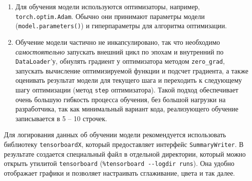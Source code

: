 \begin{enumerate}
\begin{remark}
    \end{remark}
    \item Для обучения модели используются оптимизаторы, например, \texttt{torch.optim.Adam}. Обычно они принимают параметры модели (\texttt{model.parameters()}) и гиперпараметры для алгоритма оптимизации.
    \item Обучение модели частично не инкапсулировано, так что необходимо \textit{самостоятельно} запускать внешний цикл по эпохам и внутренний по \texttt{DataLoader}'у, обнулять градиент у оптимизатора методом \texttt{zero\_grad}, запускать вычисление оптимизируемой функции и подсчет градиента, а также оценивать результат модели для текущего шага и переходить к следующему шагу оптимизации (метод \texttt{step} оптимизатора). Такой подход обеспечивает очень большую гибкость процесса обучения, без большой нагрузки на разработчика, так как минимальный вариант кода, реализующего обучение записывается в 5 -- 10 строчек. 
\end{enumerate}

\begin{remark}
    Для логирования данных об обучении модели рекомендуется использовать библиотеку \texttt{tensorboardX}, который предоставляет интерфейс \texttt{SummaryWriter}. В результате создается специальный файл в отдельной директории, который можно открыть утилитой \texttt{tensorboard} (\texttt{\%tensorboard -{}-logdir runs}). Она удобно отображает графики и позволяет настраивать сглаживание, цвета и так далее.
\end{remark}
